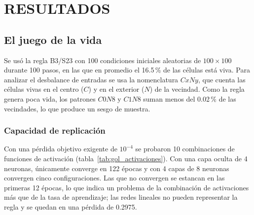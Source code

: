 \section{RESULTADOS}
\label{sec:resultados}

\subsection{El juego de la vida}

Se usó la regla B3/S23 con 100 condiciones iniciales aleatorias de $100 \times 100$ durante 100 pasos, en las que en promedio el 16.5\,\% de las células está viva. Para analizar el desbalance de entradas se usa la nomenclatura $C x N y$, que cuenta las células vivas en el centro ($C$) y en el exterior ($N$) de la vecindad. Como la regla genera poca vida, los patrones $C0N8$ y $C1N8$ suman menos del 0.02\,\% de las vecindades, lo que produce un sesgo de muestra.


\subsubsection{Capacidad de replicación}
Con una pérdida objetivo exigente de $10^{-4}$ se probaron 10 combinaciones de funciones de activación (tabla~\ref{tab:gol_activaciones}). Con una capa oculta de 4 neuronas, únicamente  converge en 122 épocas y con 4 capas de 8 neuronas convergen cinco configuraciones. Las que no convergen se estancan en las primeras 12 épocas, lo que indica un problema de la combinación de activaciones más que de la tasa de aprendizaje; las redes lineales no pueden representar la regla y se quedan en una pérdida de 0.2975.

